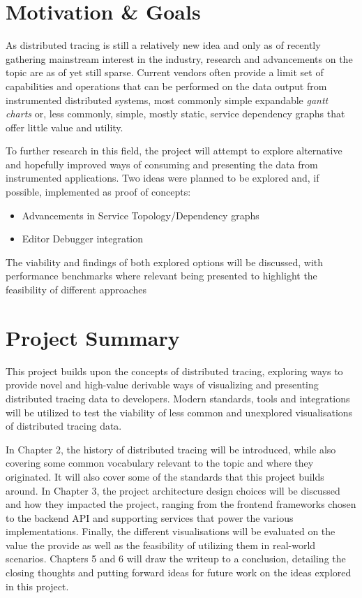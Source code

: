 \documentclass[12pt,pdftex,titlepage]{report}
\begin{document}
        \section{Motivation \& Goals}
            As distributed tracing is still a relatively new idea and only as of recently gathering mainstream interest in the industry, research and advancements on the topic are 
            as of yet still sparse. Current vendors often provide a limit set of capabilities and operations that can be performed on the data output from instrumented distributed systems,
            most commonly simple expandable \textit{gantt charts} or, less commonly, simple, mostly static, service dependency graphs that offer little value and utility.

            To further research in this field, the project will attempt to explore alternative and hopefully improved ways of consuming and presenting the data from instrumented
            applications. Two ideas were planned to be explored and, if possible, implemented as proof of concepts:

            \begin{itemize}
                \item Advancements in Service Topology/Dependency graphs
                \item Editor Debugger integration                
            \end{itemize}

            The viability and findings of both explored options will be discussed, with performance benchmarks where relevant being presented to highlight the feasibility of different
            approaches 

        \section{Project Summary}
            This project builds upon the concepts of distributed tracing, exploring ways to provide novel and high-value derivable ways of visualizing and presenting distributed tracing
            data to developers. Modern standards, tools and integrations will be utilized to test the viability of less common and unexplored visualisations of distributed tracing data.

            In Chapter 2, the history of distributed tracing will be introduced, while also covering some common vocabulary relevant to the topic and where they originated. It will also
            cover some of the standards that this project builds around. In Chapter 3, the project architecture design choices will be discussed and how they impacted the project, ranging
            from the frontend frameworks chosen to the backend API and supporting services that power the various implementations. Finally, the different visualisations will be evaluated
            on the value the provide as well as the feasibility of utilizing them in real-world scenarios. Chapters 5 and 6 will draw the writeup to a conclusion, detailing the closing
            thoughts and putting forward ideas for future work on the ideas explored in this project.
\end{document}
